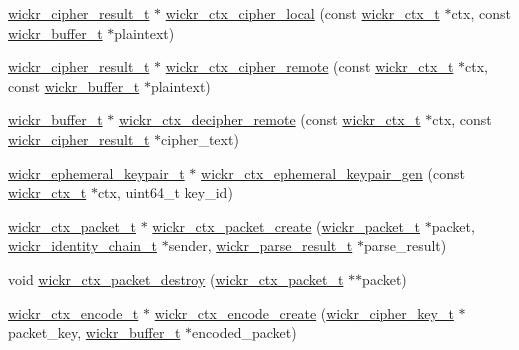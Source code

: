 \begin{DoxyCompactItemize}
\item 
\mbox{\hyperlink{structwickr__cipher__result}{wickr\+\_\+cipher\+\_\+result\+\_\+t}} $\ast$ \mbox{\hyperlink{group__wickr__ctx_gaeff6704dded2d44f689eca5ad25843f8}{wickr\+\_\+ctx\+\_\+cipher\+\_\+local}} (const \mbox{\hyperlink{structwickr__ctx}{wickr\+\_\+ctx\+\_\+t}} $\ast$ctx, const \mbox{\hyperlink{structwickr__buffer}{wickr\+\_\+buffer\+\_\+t}} $\ast$plaintext)
\item 
\mbox{\hyperlink{structwickr__cipher__result}{wickr\+\_\+cipher\+\_\+result\+\_\+t}} $\ast$ \mbox{\hyperlink{group__wickr__ctx_ga0b985fb2cd05fb482b5ed175dfd650a0}{wickr\+\_\+ctx\+\_\+cipher\+\_\+remote}} (const \mbox{\hyperlink{structwickr__ctx}{wickr\+\_\+ctx\+\_\+t}} $\ast$ctx, const \mbox{\hyperlink{structwickr__buffer}{wickr\+\_\+buffer\+\_\+t}} $\ast$plaintext)
\item 
\mbox{\hyperlink{structwickr__buffer}{wickr\+\_\+buffer\+\_\+t}} $\ast$ \mbox{\hyperlink{group__wickr__ctx_gacc1038d3690ba4860b74f13239c65600}{wickr\+\_\+ctx\+\_\+decipher\+\_\+remote}} (const \mbox{\hyperlink{structwickr__ctx}{wickr\+\_\+ctx\+\_\+t}} $\ast$ctx, const \mbox{\hyperlink{structwickr__cipher__result}{wickr\+\_\+cipher\+\_\+result\+\_\+t}} $\ast$cipher\+\_\+text)
\item 
\mbox{\hyperlink{structwickr__ephemeral__keypair}{wickr\+\_\+ephemeral\+\_\+keypair\+\_\+t}} $\ast$ \mbox{\hyperlink{group__wickr__ctx_ga45b2531085c430942122dcbf45736e10}{wickr\+\_\+ctx\+\_\+ephemeral\+\_\+keypair\+\_\+gen}} (const \mbox{\hyperlink{structwickr__ctx}{wickr\+\_\+ctx\+\_\+t}} $\ast$ctx, uint64\+\_\+t key\+\_\+id)
\item 
\mbox{\hyperlink{structwickr__ctx__packet}{wickr\+\_\+ctx\+\_\+packet\+\_\+t}} $\ast$ \mbox{\hyperlink{group__wickr__ctx_ga8ac1e1c9a0b9802d7f259278a09df56c}{wickr\+\_\+ctx\+\_\+packet\+\_\+create}} (\mbox{\hyperlink{structwickr__packet}{wickr\+\_\+packet\+\_\+t}} $\ast$packet, \mbox{\hyperlink{structwickr__identity__chain}{wickr\+\_\+identity\+\_\+chain\+\_\+t}} $\ast$sender, \mbox{\hyperlink{structwickr__parse__result}{wickr\+\_\+parse\+\_\+result\+\_\+t}} $\ast$parse\+\_\+result)
\item 
void \mbox{\hyperlink{group__wickr__ctx_gad7063bcfca4878d290e598ed6bc22e3c}{wickr\+\_\+ctx\+\_\+packet\+\_\+destroy}} (\mbox{\hyperlink{structwickr__ctx__packet}{wickr\+\_\+ctx\+\_\+packet\+\_\+t}} $\ast$$\ast$packet)
\item 
\mbox{\hyperlink{structwickr__ctx__encode}{wickr\+\_\+ctx\+\_\+encode\+\_\+t}} $\ast$ \mbox{\hyperlink{group__wickr__ctx_ga810ee459cb0ab1037b5fd1f983d0ded3}{wickr\+\_\+ctx\+\_\+encode\+\_\+create}} (\mbox{\hyperlink{structwickr__cipher__key}{wickr\+\_\+cipher\+\_\+key\+\_\+t}} $\ast$packet\+\_\+key, \mbox{\hyperlink{structwickr__buffer}{wickr\+\_\+buffer\+\_\+t}} $\ast$encoded\+\_\+packet)
$$
\end{DoxyCompactItemize}
